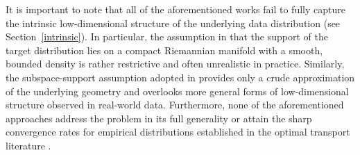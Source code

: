\documentclass[12pts]{article}
\begin{document}
 It is important to note that all of the aforementioned works fail to fully capture the intrinsic low-dimensional structure of the underlying data distribution (see Section~\ref{intrinsic}). In particular, the assumption in \citet{pmlr-v238-tang24a} that the support of the target distribution lies on a compact Riemannian manifold with a smooth, bounded density is rather restrictive and often unrealistic in practice. Similarly, the subspace-support assumption adopted in \citet{chen2023score} provides only a crude approximation of the underlying geometry and overlooks more general forms of low-dimensional structure observed in real-world data. Furthermore, none of the aforementioned approaches address the problem in its full generality or attain the sharp convergence rates for empirical distributions established in the optimal transport literature \citep{weed2019sharp}.
\end{document}
